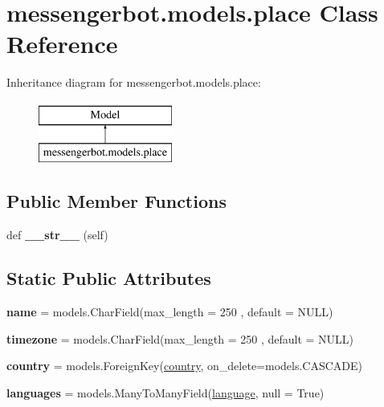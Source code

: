 \hypertarget{classmessengerbot_1_1models_1_1place}{}\section{messengerbot.\+models.\+place Class Reference}
\label{classmessengerbot_1_1models_1_1place}
Inheritance diagram for messengerbot.\+models.\+place\+:\begin{figure}[H]
\begin{center}
\leavevmode
\includegraphics[height=2.000000cm]{classmessengerbot_1_1models_1_1place}
\end{center}
\end{figure}
\subsection*{Public Member Functions}
\begin{DoxyCompactItemize}
\item 
\mbox{\label{classmessengerbot_1_1models_1_1place_ac181d9c7d3b1926c65008ba8b28efba5}} 
def {\bfseries \+\_\+\+\_\+str\+\_\+\+\_\+} (self)
\end{DoxyCompactItemize}
\subsection*{Static Public Attributes}
\begin{DoxyCompactItemize}
\item 
\mbox{\label{classmessengerbot_1_1models_1_1place_ae0d24c4671e9ce38726f84ce8ceb0103}} 
{\bfseries name} = models.\+Char\+Field(max\+\_\+length = 250 , default = \textquotesingle{}N\+U\+LL\textquotesingle{})
\item 
\mbox{\label{classmessengerbot_1_1models_1_1place_afba837819d7d201fd5862ec7af55825f}} 
{\bfseries timezone} = models.\+Char\+Field(max\+\_\+length = 250 , default = \textquotesingle{}N\+U\+LL\textquotesingle{})
\item 
\mbox{\label{classmessengerbot_1_1models_1_1place_a1446d5fdbadcd68a658aab909504dc21}} 
{\bfseries country} = models.\+Foreign\+Key(\hyperlink{classmessengerbot_1_1models_1_1country}{country}, on\+\_\+delete=models.\+C\+A\+S\+C\+A\+DE)
\item 
\mbox{\label{classmessengerbot_1_1models_1_1place_a84e97bec05192c2bbdd3123732896d2e}} 
{\bfseries languages} = models.\+Many\+To\+Many\+Field(\hyperlink{classmessengerbot_1_1models_1_1language}{language}, null = True)
\end{DoxyCompactItemize}


